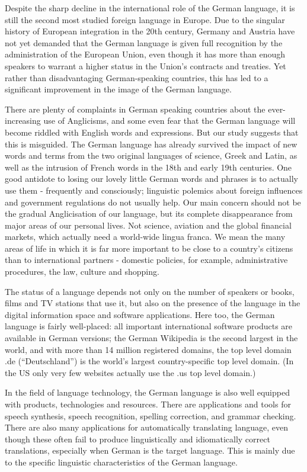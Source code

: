 \begin{multicols}{2}
Despite the sharp decline in the international role of the German language, it is still the second most studied foreign language in Europe. Due to the singular history of European integration in the 20th century, Germany and Austria have not yet demanded that the German language is given full recognition by the administration of the European Union, even though it has more than enough speakers to warrant a higher status in the Union’s contracts and treaties. Yet rather than disadvantaging German-speaking countries, this has led to a significant improvement in the image of the German language. 

There are plenty of complaints in German speaking countries about the ever-increasing use of Anglicisms, and some even fear that the German language will become riddled with English words and expressions. But our study suggests that this is misguided. The German language has already survived the impact of new words and terms from the two original languages of science, Greek and Latin, as well as the intrusion of French words in the 18th and early 19th centuries. One good antidote to losing our lovely little German words and phrases is to actually use them - frequently and consciously; linguistic polemics about foreign influences and government regulations do not usually help. Our main concern should not be the gradual Anglicisation of our language, but its complete disappearance from major areas of our personal lives. Not science, aviation and the global financial markets, which actually need a world-wide lingua franca. We mean the many areas of life in which it is far more important to be close to a country’s citizens than to international partners - domestic policies, for example, administrative procedures, the law, culture and shopping.

The status of a language depends not only on the number of speakers or books, films and TV stations that use it, but also on the presence of the language in the digital information space and software applications. Here too, the German language is fairly well-placed: all important international software products are available in German versions; the German Wikipedia is the second largest in the world, and with more than 14 million registered domains, the top level domain .de (“Deutschland”) is the world’s largest country-specific top level domain. (In the US only very few websites actually use the .us top level domain.)
 
In the field of language technology, the German language is also well equipped with products, technologies and resources. There are applications and tools for speech synthesis, speech recognition, spelling correction, and grammar checking. There are also many applications for automatically translating language, even though these often fail to produce linguistically and idiomatically correct translations, especially when German is the target language. This is mainly due to the specific linguistic characteristics of the German language.


\end{multicols}
